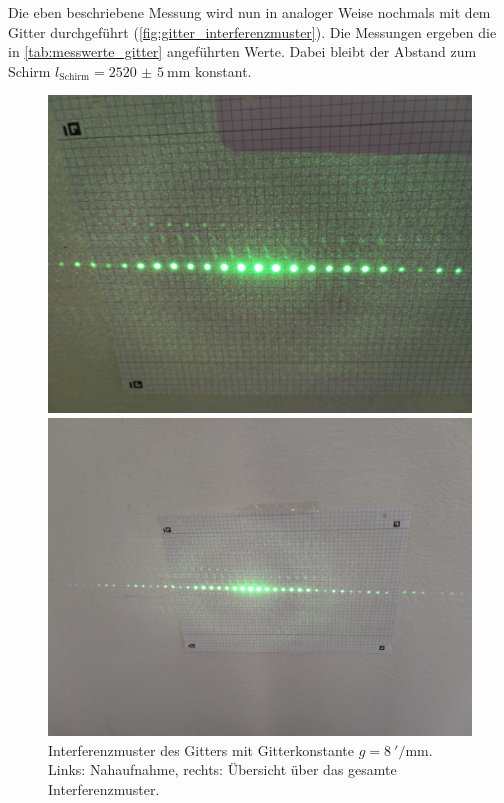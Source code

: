 \documentclass[ngerman]{scrartcl}
\begin{document}
%
Die eben beschriebene Messung wird nun in analoger Weise nochmals mit dem Gitter durchgeführt (\autoref{fig:gitter_interferenzmuster}). Die Messungen ergeben die in \autoref{tab:messwerte_gitter} angeführten Werte. Dabei bleibt der Abstand zum Schirm $l_\text{Schirm} = \SI{2520(5)}{\milli\meter}$ konstant.
%
\setcapindent{0pt}
\begin{figure}[H]
    \centering
    \begin{minipage}[t]{0.45\linewidth}
        \centering
        \includegraphics[width=\linewidth]{fig/Compressed/Gitter_8_per_mm.jpg}
    \end{minipage}%
    \hspace*{\fill}
    \begin{minipage}[t]{0.45\linewidth}
        \centering
        \includegraphics[width=\linewidth]{fig/Compressed/Gitter_8_per_mm_overview.jpg}
    \end{minipage}
    \caption[Interferenzmuster des Gitters]{Interferenzmuster des Gitters mit Gitterkonstante $g=\SI{8}{'\per\milli\meter}$. Links: Nahaufnahme, rechts: Übersicht über das gesamte Interferenzmuster.}
    \label{fig:gitter_interferenzmuster}
\end{figure}
\end{document}
